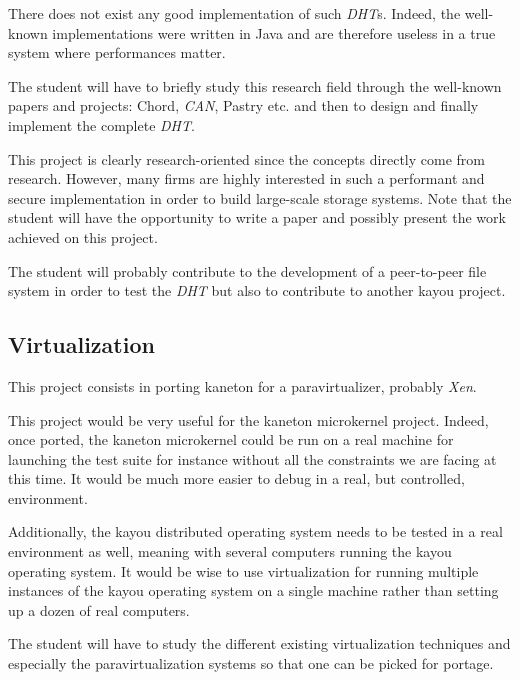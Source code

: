 \begin{multicols}{2}
There does not exist any good implementation of such \textit{DHT}s. Indeed,
the well-known implementations were written in Java and are therefore
useless in a true system where performances matter.

The student will have to briefly study this research field through the
well-known papers and projects: Chord, \textit{CAN}, Pastry etc. and then
to design and finally implement the complete \textit{DHT}.

This project is clearly research-oriented since the concepts directly come
from research. However, many firms are highly interested in such a
performant and secure implementation in order to build large-scale storage
systems. Note that the student will have the opportunity to write a paper and
possibly present the work achieved on this project.

The student will probably contribute to the development of a peer-to-peer
file system in order to test the \textit{DHT} but also to contribute to
another kayou project.

%
%

\subsection{Virtualization}

This project consists in porting kaneton for a paravirtualizer, probably
\textit{Xen}.

This project would be very useful for the kaneton microkernel project. Indeed,
once ported, the kaneton microkernel could be run on a real machine for
launching the test suite for instance without all the constraints we are
facing at this time. It would be much more easier to debug in a real, but
controlled, environment.

Additionally, the kayou distributed operating system needs to be tested in
a real environment as well, meaning with several computers running the kayou
operating system. It would be wise to use virtualization for running multiple
instances of the kayou operating system on a single machine rather than
setting up a dozen of real computers.

The student will have to study the different existing virtualization techniques
and especially the paravirtualization systems so that one can be picked
for portage.

\end{multicols}



